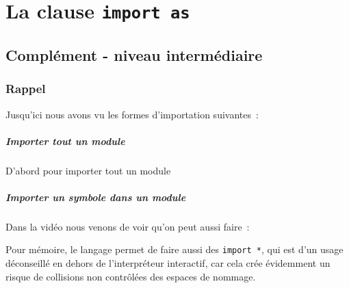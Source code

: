     
    
    
    

    

    \hypertarget{la-clause-import-as}{%
\section{\texorpdfstring{La clause
\texttt{import\ as}}{La clause import as}}\label{la-clause-import-as}}

    \hypertarget{compluxe9ment---niveau-intermuxe9diaire}{%
\subsection{Complément - niveau
intermédiaire}\label{compluxe9ment---niveau-intermuxe9diaire}}

    \hypertarget{rappel}{%
\subsubsection{Rappel}\label{rappel}}

    Jusqu'ici nous avons vu les formes d'importation suivantes~:

    \hypertarget{importer-tout-un-module}{%
\subparagraph{Importer tout un module}\label{importer-tout-un-module}}

    D'abord pour importer tout un module

    \begin{Shaded}
\begin{Highlighting}[frame=lines,framerule=0.6mm,rulecolor=\color{asisframecolor}]
\end{Highlighting}
\end{Shaded}

    \hypertarget{importer-un-symbole-dans-un-module}{%
\subparagraph{Importer un symbole dans un
module}\label{importer-un-symbole-dans-un-module}}

    Dans la vidéo nous venons de voir qu'on peut aussi faire~:

    \begin{Shaded}
\begin{Highlighting}[frame=lines,framerule=0.6mm,rulecolor=\color{asisframecolor}]
\end{Highlighting}
\end{Shaded}

    Pour mémoire, le langage permet de faire aussi des \texttt{import\ *},
qui est d'un usage déconseillé en dehors de l'interpréteur interactif,
car cela crée évidemment un risque de collisions non contrôlées des
espaces de nommage.

